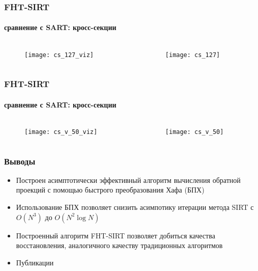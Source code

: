 \begin{frame}
\frametitle{FHT-SIRT}
\framesubtitle{сравнение с SART: кросс-секции}
\begin{columns}[T,onlytextwidth]
  \hspace*{-1cm}
  \begin{column}{0.4\textwidth}
    \begin{figure}
      \centering
      \texttt{[image: cs\_127\_viz]}
    \end{figure}
  \end{column}
  \begin{column}{0.6\textwidth}
    \begin{figure}
      \centering
      \texttt{[image: cs\_127]}
    \end{figure}
  \end{column}
\end{columns}
\end{frame}


\begin{frame}
\frametitle{FHT-SIRT}
\framesubtitle{сравнение с SART: кросс-секции}
\begin{columns}[T,onlytextwidth]
  \hspace*{-1cm}
  \begin{column}{0.4\textwidth}
    \begin{figure}
      \centering
      \texttt{[image: cs\_v\_50\_viz]}
    \end{figure}
  \end{column}
  \begin{column}{0.6\textwidth}
    \begin{figure}
      \centering
      \texttt{[image: cs\_v\_50]}
    \end{figure}
  \end{column}
\end{columns}
\end{frame}


\begin{frame}
\frametitle{Выводы}
\begin{itemize}
  \item Построен асимптотически эффективный алгоритм вычисления обратной проекций с помощью быстрого преобразования Хафа (БПХ)
  \item Использование БПХ позволяет снизить асимпотику итерации метода SIRT с $O(N^3)$ до $O(N^2 \log N)$
  \item Построенный алгоритм FHT-SIRT позволяет добиться качества восстановления, аналогичного качеству традиционных алгоритмов
  \item Публикации \cite{Prun2013AutomAndRemCont, Prun2013Crys}
\end{itemize}
\end{frame}